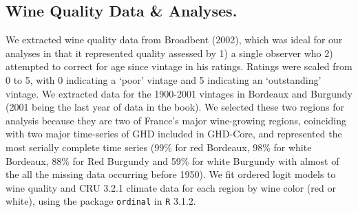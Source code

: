 \documentclass[final]{nature}
\begin{document}
\begin{methods}
\subsection{Wine Quality Data \& Analyses.}
We extracted wine quality data from Broadbent (2002)\cite{Broadbent2002}, which was ideal for our analyses in that it represented quality assessed by 1) a single observer who 2) attempted to correct for age since vintage in his ratings. Ratings were scaled from 0 to 5, with 0 indicating a `poor' vintage and 5 indicating an `outstanding' vintage. We extracted data for the 1900-2001 vintages in Bordeaux and Burgundy (2001 being the last year of data in the book). We selected these two regions for analysis because they are two of France's major wine-growing regions, coinciding with two major time-series of GHD included in GHD-Core, and represented the most serially complete time series (99\% for red Bordeaux, 98\% for white Bordeaux, 88\% for Red Burgundy and 59\% for white Burgundy with almost of the all the missing data occurring before 1950). We fit ordered logit models to wine quality and CRU 3.2.1 climate data for each region by wine color (red or white), using the package \verb|ordinal| in \verb|R| 3.1.2\cite{Rcore2014}.

\end{methods}





\end{document}
